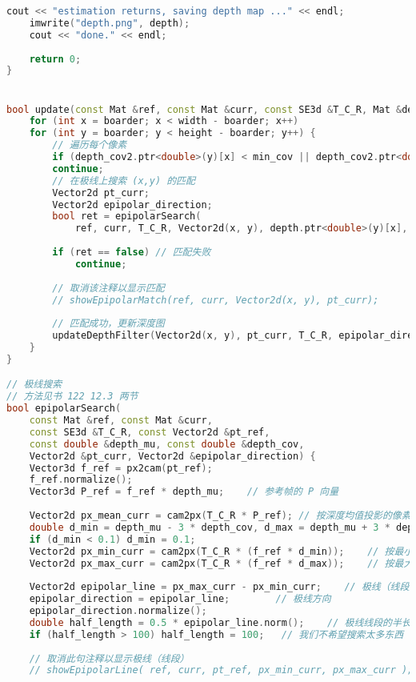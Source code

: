 \begin{lstlisting}[language=c++,caption=slambook2/ch12/dense\_monocular/dense\_mapping.cpp（片段）]
    cout << "estimation returns, saving depth map ..." << endl;
    imwrite("depth.png", depth);
    cout << "done." << endl;
    
    return 0;
}


bool update(const Mat &ref, const Mat &curr, const SE3d &T_C_R, Mat &depth, Mat &depth_cov2) {
    for (int x = boarder; x < width - boarder; x++)
    for (int y = boarder; y < height - boarder; y++) {
        // 遍历每个像素
        if (depth_cov2.ptr<double>(y)[x] < min_cov || depth_cov2.ptr<double>(y)[x] > max_cov) // 深度已收敛或发散
        continue;
        // 在极线上搜索 (x,y) 的匹配
        Vector2d pt_curr;
        Vector2d epipolar_direction;
        bool ret = epipolarSearch(
            ref, curr, T_C_R, Vector2d(x, y), depth.ptr<double>(y)[x],           sqrt(depth_cov2.ptr<double>(y)[x]), pt_curr, epipolar_direction);
        
        if (ret == false) // 匹配失败
            continue;
            
        // 取消该注释以显示匹配
        // showEpipolarMatch(ref, curr, Vector2d(x, y), pt_curr);
        
        // 匹配成功，更新深度图
        updateDepthFilter(Vector2d(x, y), pt_curr, T_C_R, epipolar_direction, depth, depth_cov2);
    }
}

// 极线搜索
// 方法见书 122 12.3 两节
bool epipolarSearch(
    const Mat &ref, const Mat &curr,
    const SE3d &T_C_R, const Vector2d &pt_ref,
    const double &depth_mu, const double &depth_cov,
    Vector2d &pt_curr, Vector2d &epipolar_direction) {
    Vector3d f_ref = px2cam(pt_ref);
    f_ref.normalize();
    Vector3d P_ref = f_ref * depth_mu;    // 参考帧的 P 向量
    
    Vector2d px_mean_curr = cam2px(T_C_R * P_ref); // 按深度均值投影的像素
    double d_min = depth_mu - 3 * depth_cov, d_max = depth_mu + 3 * depth_cov;
    if (d_min < 0.1) d_min = 0.1;
    Vector2d px_min_curr = cam2px(T_C_R * (f_ref * d_min));    // 按最小深度投影的像素
    Vector2d px_max_curr = cam2px(T_C_R * (f_ref * d_max));    // 按最大深度投影的像素
    
    Vector2d epipolar_line = px_max_curr - px_min_curr;    // 极线（线段形式）
    epipolar_direction = epipolar_line;        // 极线方向
    epipolar_direction.normalize();
    double half_length = 0.5 * epipolar_line.norm();    // 极线线段的半长度
    if (half_length > 100) half_length = 100;   // 我们不希望搜索太多东西
    
    // 取消此句注释以显示极线（线段）
    // showEpipolarLine( ref, curr, pt_ref, px_min_curr, px_max_curr );
    

\end{lstlisting}
